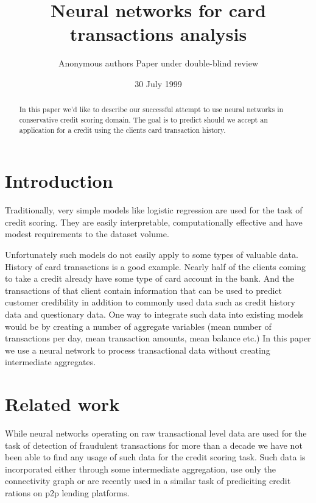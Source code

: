 \documentclass{sigkddExp}
\begin{document}
\title{Neural networks for card transactions analysis}

\author{
\alignauthor Anonymous authors
Paper under double-blind review
}

\date{30 July 1999}
\maketitle
\begin{abstract}
In this paper we'd like to describe our successful attempt to use neural networks in conservative credit scoring domain.
The goal is to predict should we accept an application for a credit using the clients card transaction history.
\end{abstract}

\section{Introduction}
Traditionally, very simple models like logistic regression are used for the task of credit scoring. They are easily interpretable, computationally effective and have modest requirements to the dataset volume.

Unfortunately such models do not easily apply to some types of valuable data. History of card transactions is a good example. Nearly half of the clients coming to take a credit already have some type of card account in the bank. And the transactions of that client contain information that can be used to predict customer credibility in addition to commonly used data such as credit history data and questionary data. One way to integrate such data into existing models would be by creating a number of aggregate variables (mean number of transactions per day, mean transaction amounts, mean balance etc.) In this paper we use a neural network to process transactional data without creating intermediate aggregates.

\section{Related work}

While neural networks operating on raw transactional level data are used for the task of detection of fraudulent transactions for more than a decade \cite{fraud_lstm} we have not been able to find any usage of such data for the credit scoring task. Such data is incorporated either through some intermediate aggregation, use only the connectivity graph\cite{RePEc} or are recently used in a similar task of prediciting credit rations on p2p lending platforms.
\end{document}
